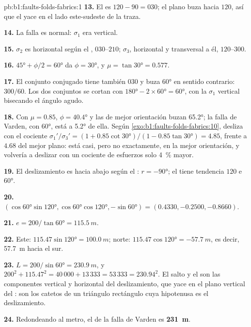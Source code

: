 \begin{solution}{pb:b1:faults-folds-fabrics:1}
\textbf{13.} El  es $120 - 90 = 030$; el plano buza hacia $120$, así que el  yace en el lado este-sudeste de la
traza.

\textbf{14.} La falla es normal: $\sigma_1$ era vertical.

\textbf{15.} $\sigma_2$ es horizontal según el , $030$--$210$; $\sigma_3$, horizontal y transversal a él, $120$--$300$.

\textbf{16.} $\ang{45} + \phi/2 = \ang{60}$ da $\phi = \ang{30}$, y $\mu = \tan\ang{30} = 0.577$.

\textbf{17.} El conjunto conjugado tiene también  $030$ y buza \ang{60} en sentido contrario: $300/60$. Los dos conjuntos se
cortan con $\ang{180} - 2\times\ang{60} = \ang{60}$, con la $\sigma_1$ vertical bisecando el ángulo agudo.

\textbf{18.} Con $\mu = 0.85$, $\phi = \ang{40.4}$ y las  de mejor orientación buzan \ang{65.2}; la falla de Varden, con
\ang{60}, está a \ang{5.2} de ella. Según \cref{exo:b1:faults-folds-fabrics:10}, desliza con el cociente
$\sigma_1'/\sigma_3' = (1 + 0.85\cot\ang{30})/(1 - 0.85\tan\ang{30}) = 4.85$, frente a $4.68$ del mejor plano: está casi, pero no
exactamente, en la mejor orientación, y volvería a deslizar con un cociente de esfuerzos solo \qty{4}{\percent} mayor.

\textbf{19.} El deslizamiento es hacia abajo según el : $r = \ang{-90}$; el  tiene tendencia
$120$ e  \ang{60}.

\textbf{20.} $(\cos\ang{60}\sin\ang{120}, \cos\ang{60}\cos\ang{120},
-\sin\ang{60}) = (0.4330, -0.2500, -0.8660)$.

\textbf{21.} $e = 200/\tan\ang{60} = \qty{115.5}{m}$.

\textbf{22.} Este: $115.47\sin\ang{120} = \qty{100.0}{m}$; norte:
$115.47\cos\ang{120} = \qty{-57.7}{m}$, es decir, \qty{57.7}{m} hacia el sur.

\textbf{23.} $L = 200/\sin\ang{60} = \qty{230.9}{m}$, y
$200^2 + 115.47^2 = 40\,000 + 13\,333 = 53\,333 = 230.94^2$. El salto y el  son las componentes vertical y
horizontal del deslizamiento, que yace en el plano vertical del : son los catetos de un triángulo rectángulo cuya
hipotenusa es el deslizamiento.

\textbf{24.} Redondeando al metro, el  de la falla de Varden es
\textbf{\qty[text-series-to-math=true]{231}{m}}.
\end{solution}
